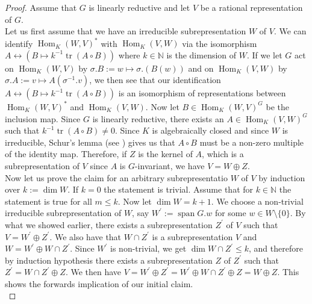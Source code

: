 \begin{proof}
  Assume that $G$ is linearly reductive and let $V$ be a rational representation of $G$.\\
  Let us first assume that we have an irreducible subrepresentation $W$ of $V$.
  We can identify $\operatorname{Hom}_K(W,V)^\ast$ with $\operatorname{Hom}_K(V,W)$ via the isomorphism  $A \leftrightarrow (B \mapsto k^{-1}\operatorname{tr}(A \circ B))$ where $k \in \mathbb{N}$ is the dimension of $W$.
  If we let $G$ act on $ \operatorname{Hom}_K(W,V)$ by $ \sigma.B :=  w \mapsto \sigma . (B(w))$ and on $\operatorname{Hom}_K(V,W)$ by $ \sigma.A := v \mapsto A(\sigma^{-1}.v) $, we then see that our identification $A \leftrightarrow (B \mapsto k^{-1}\operatorname{tr}(A \circ B))$ is an isomorphism of representations between $\operatorname{Hom}_K(W,V)^\ast$ and $\operatorname{Hom}_K(V,W)$. %
  Now let $B \in \operatorname{Hom}_K(W,V)^G$ be the inclusion map.
  Since $G$ is linearly reductive, there exists an $A \in \operatorname{Hom}_K(V,W)^G$ such that $k^{-1} \operatorname{tr}(A \circ B) \neq 0$.
  Since $K$ is algebraically closed and since $W$ is irreducible, Schur's lemma (see \cite[1.7]{FH91}) gives us that $A \circ B$ must be a non-zero multiple of the identity map.
  Therefore, if $Z$ is the kernel of $A$, which is a subrepresentation of $V$ since $A$ is $G$-invariant, we have $V = W \oplus Z$.\\
  Now let us prove the claim for an arbitrary subrepresentatio $W$ of $V$ by induction over $k := \operatorname{dim}W$.
  If $k=0$ the statement is trivial.
  Assume that for $k \in \mathbb{N}$ the statement is true for all $m \leq k$.
  Now let $\operatorname{dim}W = k +1$.
  We choose a non-trivial irreducible subrepresentation of $W$, say $W^\prime := \operatorname{span}G.w$ for some $w \in W \setminus \{0\}$.
  By what we showed earlier, there exists a subrepresentation $Z^\prime$ of $V$ such that $V = W^\prime \oplus Z^\prime$.
  We also have that $W \cap Z^\prime$ is a subrepresentation $V$ and $W = W^\prime \oplus W \cap Z^\prime$.
  Since $W^\prime$ is non-trivial, we get $\operatorname{dim} W \cap Z^\prime \leq k$, and therefore by induction hypothesis there exists a subrepresentation $Z$ of $Z^\prime$ such that $Z^\prime = W \cap Z^\prime \oplus Z$.
  We then have $V = W^\prime \oplus Z^\prime = W^\prime \oplus W \cap Z^\prime \oplus Z = W \oplus Z$.
  This shows the forwards implication of our initial claim.\\  

\end{proof}
